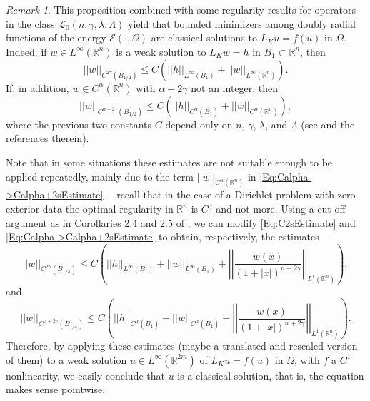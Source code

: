 \documentclass[12pt,reqno]{amsart}
\theoremstyle{definition}
\theoremstyle{remark}
\newtheorem{remark}[theorem]{Remark}
\newcommand{\con}[1]{\mathbb{#1}}
\newcommand{\R}{\con{R}} %
\newcommand{\ecal}{\mathcal{E}}
\newcommand{\lcal}{\mathcal{L}}
\newcommand{\norm}[1]{\left | \left |{#1} \right | \right |}
\newcommand{\s}{\gamma}
\newcommand{\bpar}[1]{\left ( {#1}\right )}
\numberwithin{equation}{section}
\begin{document}
\begin{remark}
	\label{Remark:InteriorRegularity}
	This proposition combined with some regularity results for operators in the class $\lcal_0(n,\s,\lambda, \Lambda)$ yield that bounded minimizers among doubly radial functions of the energy $\ecal(\cdot,\Omega)$ are classical solutions to $L_K u = f(u)$ in $\Omega$. Indeed, if $w\in L^\infty (\R^n)$ is a weak solution to $L_K w = h$ in $B_1\subset \R^n$, then
	\begin{equation}
	\label{Eq:C2sEstimate}
	\norm{w}_{C^{2\s} (\overline{B_{1/2}})} \leq C\bpar{\norm{h}_{L^\infty (B_1)} + \norm{w}_{L^\infty  (\R^n)}}.
	\end{equation} 
	If, in addition, $w \in C^\alpha (\R^n)$ with $\alpha + 2\s$ not an integer, then
	\begin{equation}
	\label{Eq:Calpha->Calpha+2sEstimate}
	\norm{w}_{C^{\alpha + 2\s} (\overline{B_{1/2}})} \leq C\bpar{\norm{h}_{C^{\alpha} (\overline{B_1})} + \norm{w}_{C^\alpha (\R^n)} },
	\end{equation}
	where the previous two constants $C$ depend only on $n$, $\s$, $\lambda$, and $\Lambda$ (see \cite{RosOton-Survey,SerraC2s+alphaRegularity} and the references therein).
	
	
	Note that in some situations these estimates are not suitable enough to be applied repeatedly, mainly due to the term $\norm{w}_{C^\alpha (\R^n)}$ in \eqref{Eq:Calpha->Calpha+2sEstimate} ---recall that in the case of a Dirichlet problem with zero exterior data the optimal regularity in $\R^n$ is $C^\s$ and not more. Using a cut-off argument as in Corollaries 2.4 and 2.5 of \cite{RosOtonSerra-Regularity}, we can modify \eqref{Eq:C2sEstimate} and \eqref{Eq:Calpha->Calpha+2sEstimate} to obtain, respectively, the estimates
	\begin{equation}
	\label{Eq:C2sEstimateBalls}
	\norm{w}_{C^{2\s} (\overline{B_{1/4}})} \leq C\bpar{\norm{h}_{L^\infty (B_1)} + \norm{w}_{L^\infty  (B_1)} + \norm{\dfrac{w(x)}{(1+|x|)^{n+2\s}}}_{L^1(\R^n)} },
	\end{equation}
	and 
	\begin{equation}
	\label{Eq:Calpha->Calpha+2sEstimateBalls}
	\norm{w}_{C^{\alpha + 2\s} (\overline{B_{1/4}})} \leq C\bpar{\norm{h}_{C^{\alpha} (\overline{B_1})} + \norm{w}_{C^\alpha (\overline{B_1})} + \norm{\dfrac{w(x)}{(1+|x|)^{n+2\s}}}_{L^1(\R^n)} }.
	\end{equation}
	Therefore, by applying these estimates (maybe a translated and rescaled version of them) to a weak solution $u\in L^\infty(\R^{2m})$ of $L_K u = f(u)$ in $\Omega$, with $f$ a $C^1$ nonlinearity, we easily conclude that $u$ is a classical solution, that is, the equation makes sense pointwise.
\end{remark}
\end{document}
